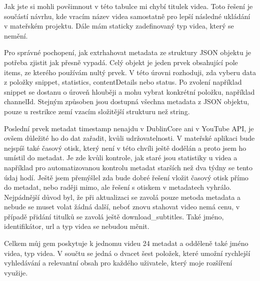 \par Jak jste si mohli povšimnout v této tabulce mi chybí titulek videa. Toto řešení je součástí návrhu, kde vracím název videa samostatně pro lepší následné ukládání v mateřském projektu. Dále mám staticky zadefinovaný typ videa, který se nemění. 
\par Pro správné pochopení, jak extrhahovat metadata ze struktury JSON objektu je potřeba zjistit jak přesně vypadá. Celý objekt je jeden prvek obsahující pole items, ze kterého používám nultý prvek. V této úrovni rozhoduji, zda vyberu data z položky snippet, statistics, contentDetails nebo status. Po zvolení například snippet se dostanu o úroveň hlouběji a mohu vybrat konkrétní položku, například channelId. Stejným způsoben jsou dostupná všechna metadata z JSON objektu, pouze u restrikce zemí vzacím složitější strukturu než string.
\par Poslední prvek metadat timestamp nenajdu v DublinCore ani v YouTube API, je ovšem důležité ho do dat zařadit, kvůli udržovatelnosti. V mateřské aplikaci bude nejspíš také časový otisk, který není v této chvíli ještě dodělán a proto jsem ho umístil do metadat. Je zde kvůli kontrole, jak staré jsou statistiky u videa a například pro automatizovanou kontrolu metadat starších než dva týdny se tento údaj hodí. Ještě jsem přemýšlel zda bude dobré řešení vložit časový otisk přímo do metadat, nebo raději mimo, ale řešení s otiskem v metadatech vyhrálo. Nejpádnější důvod byl, že při aktualizaci se zavolá pouze metoda metadata a nebude se muset volat žádná další, neboť znovu stahovat video nemá cenu, v případě přidání titulků se zavolá ještě download\_subtitles. Také jméno, identifikátor, url a typ videa se nebudou měnit.
\par Celkem můj gem poskytuje k jednomu videu 24 metadat a odděleně také jméno videa, typ videa. V součtu se jedná o dvacet šest položek, které umožní rychlejší vyhledávání a relevantní obsah pro každého uživatele, který moje rozšíření využije.


